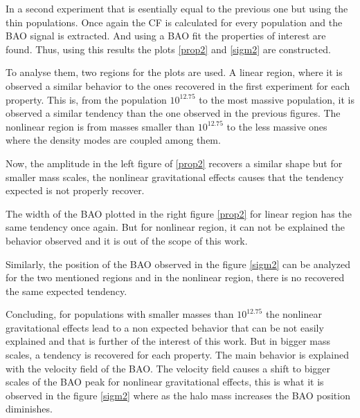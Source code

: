 		
In a second experiment that is esentially equal to the previous one but using the 
thin populations. 
Once again the CF is calculated for every population and the BAO signal is extracted. 
And using a BAO fit the properties of interest are found. Thus, using this results the 
plots \ref{prop2} and \ref{sigm2} are constructed. 

To analyse them, two regions for the plots are used. A linear region, where it is observed
a similar behavior to the ones recovered in the first experiment for each property. This is, 
from the population $10^{12.75}$ to the most massive population, it is observed a similar 
tendency than the one observed in the previous figures. 
The nonlinear region is from masses smaller than $10^{12.75}$  to the less massive ones where
the density modes are coupled among them. 

Now, the amplitude in the left figure of \ref{prop2} recovers a similar shape but
for smaller mass scales, the nonlinear gravitational effects causes that the tendency
expected is not properly recover. 	

The width of the BAO plotted in the right figure \ref{prop2} for linear region has the 
same tendency once again. But for nonlinear region, it can not be explained the behavior 
observed and it is out of the scope of this work.

Similarly, the position of the BAO observed in the figure \ref{sigm2} can be analyzed
for the two mentioned regions and in the nonlinear region, there is no recovered the 
same expected tendency. 

Concluding, for populations with smaller masses than $10^{12.75}$ the nonlinear gravitational
effects lead to a non expected behavior that can be not easily explained and that is further
of the interest of this work. But in bigger mass scales, a tendency is recovered for each
property. The main behavior is explained with the velocity field of the BAO. The velocity
field causes a shift to bigger scales of the BAO peak for nonlinear gravitational effects, 
this is what it is observed in the figure \ref{sigm2} where as the halo mass increases 
the BAO position diminishes.










